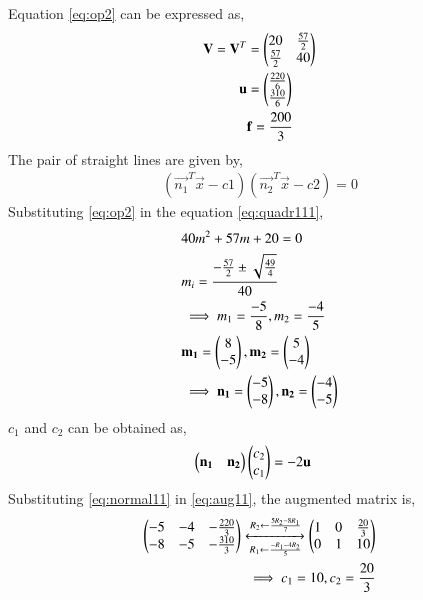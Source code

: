 \documentclass[journal,12pt,twocolumn]{IEEEtran}
\begin{document}
Equation \eqref{eq:op2} can be expressed as,
\begin{align}
\mathbf{V}=\mathbf{V}^T&=\begin{pmatrix}20 & \frac{57}{2} \\ \frac{57}{2} & 40\end{pmatrix} \label{eq:eq1vec1}\\
\mathbf{u}&=\begin{pmatrix}\frac{220}{6} \\ \frac{310}{6}\end{pmatrix} \label{eq:eq2vec1}\\
&\mathbf{f}=\frac{200}{3}
\end{align}
The pair of straight lines are given by,
\begin{align}
    (\vec{n_1}^{T}\vec{x} - c1)(\vec{n_2}^{T}\vec{x} - c2)=0\label{eq:maineq2}
\end{align}
Substituting \eqref{eq:op2} in the equation \eqref{eq:quadr111},
\begin{align}
    &40m^2+57m+20=0 \label{eq:quadr11}\\
    &m_i=\frac{-\frac{57}{2}\pm{\sqrt{\frac{49}{4}}}}{40}\\
    &\implies m_1 = \frac{-5}{8} , m_2 = \frac{-4}{5}\\
    & \mathbf{m_1}=\begin{pmatrix}8\\ -5\end{pmatrix}, \mathbf{m_2}=\begin{pmatrix}5\\ -4\end{pmatrix}\\
    &\implies \mathbf{n_1}=\begin{pmatrix}-5\\ -8\end{pmatrix}, \mathbf{n_2}=\begin{pmatrix}-4\\ -5\end{pmatrix} \label{eq:normal11}
\end{align}
$c_1$ and $c_2$ can be obtained as,
\begin{align}
\begin{pmatrix}\mathbf{n_1} & \mathbf{n_2}\end{pmatrix}\begin{pmatrix}c_2\\c_1\end{pmatrix}&=-2\mathbf{u} \label{eq:aug11}
\end{align}
Substituting \eqref{eq:normal11} in \eqref{eq:aug11}, the augmented matrix is,
\begin{align}
\begin{pmatrix}-5 & -4 & -\frac{220}{3} \\ -8 & -5 & -\frac{310}{3}\end{pmatrix}
\xleftrightarrow[R_1\leftarrow \frac{-R_1-4R_2}{5}]{R_2\leftarrow \frac{5R_2-8R_1}{7}}
\begin{pmatrix}1 &0 &\frac{20}{3} \\ 0& 1 & 10\end{pmatrix} \label{eq:aug21}\\
\implies c_1 = 10, c_2=\frac{20}{3} \label{eq:const11}
\end{align}
\end{document}

